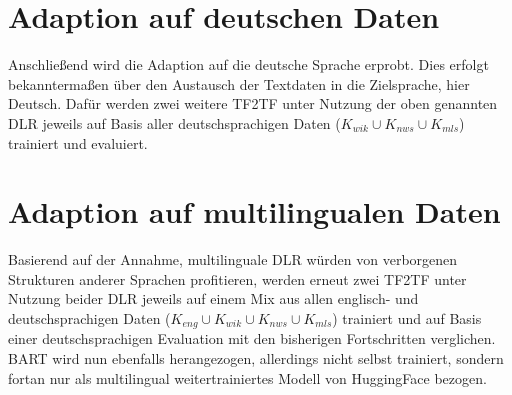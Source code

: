 \section{Adaption auf deutschen Daten}
\noindent
Anschließend wird die Adaption auf die deutsche Sprache erprobt. Dies erfolgt bekanntermaßen über den Austausch der Textdaten in die Zielsprache, hier Deutsch. Dafür werden zwei weitere \ac{TF2TF} unter Nutzung der oben genannten \ac{DLR} jeweils auf Basis aller deutschsprachigen Daten ($K_{wik} \cup K_{nws} \cup K_{mls}$) trainiert und evaluiert.


\section{Adaption auf multilingualen Daten}
\noindent
Basierend auf der Annahme, multilinguale \ac{DLR} würden von verborgenen Strukturen anderer Sprachen profitieren, werden erneut zwei \ac{TF2TF} unter Nutzung beider \ac{DLR} jeweils auf einem Mix aus allen englisch- und deutschsprachigen Daten ($K_{eng} \cup K_{wik} \cup K_{nws} \cup K_{mls}$) trainiert und auf Basis einer deutschsprachigen Evaluation mit den bisherigen Fortschritten verglichen. \ac{BART} wird nun ebenfalls herangezogen, allerdings nicht selbst trainiert, sondern fortan nur als multilingual weitertrainiertes Modell von HuggingFace bezogen.
